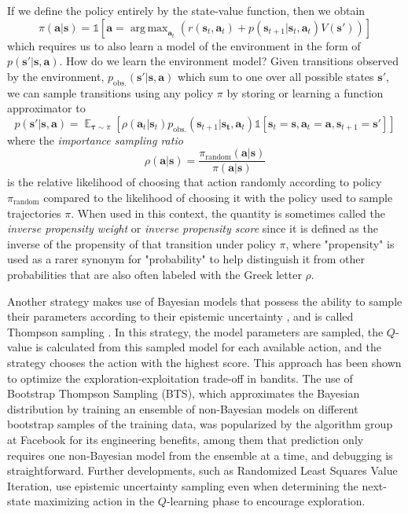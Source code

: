 \documentclass{article}
\DeclareMathOperator*{\argmax}{arg\,max}
\begin{document}
If we define the policy entirely by the state-value function, then we obtain \begin{equation}\pi(\mathbf{a}|\mathbf{s})=\mathbb{1}\left[\mathbf{a}=\argmax_{\mathbf{a}_t}\left(r(\mathbf{s}_t,\mathbf{a}_t)+p(\mathbf{s}_{t+1}|\mathbf{s}_t,\mathbf{a}_t)V(\mathbf{s}')\right)\right]\end{equation}which requires us to also learn a model of the environment in the form of $p(\mathbf{s}'|\mathbf{s},\mathbf{a})$. How do we learn the environment model? Given transitions observed by the environment, $p_\text{obs.}(\mathbf{s}'|\mathbf{s},\mathbf{a})$ which sum to one over all possible states $\mathbf{s}'$, we can sample transitions using any policy $\pi$ by storing or learning a function approximator to \begin{equation}p(\mathbf{s}'|\mathbf{s},\mathbf{a})=\mathop{\mathbb{E}}_{\boldsymbol{\tau}\sim\pi}\left[\rho(\mathbf{a}_t|\mathbf{s}_t)p_\text{obs.}(\mathbf{s}_{t+1}|\mathbf{s_t},\mathbf{a}_t)\mathbb{1}\left[\mathbf{s}_t=\mathbf{s},\mathbf{a}_t=\mathbf{a},\mathbf{s}_{t+1}=\mathbf{s}'\right]\right]\end{equation}where the \textit{importance sampling ratio}
\begin{equation}\rho(\mathbf{a}|\mathbf{s})=\frac{\pi_\text{random}(\mathbf{a}|\mathbf{s})}{\pi(\mathbf{a}|\mathbf{s})}\end{equation}is the relative likelihood of choosing that action randomly according to policy $\pi_\text{random}$ compared to the likelihood of choosing it with the policy used to sample trajectories $\pi$. When used in this context, the quantity is sometimes called the \textit{inverse propensity weight} or \textit{inverse propensity score} since it is defined as the inverse of the propensity of that transition under policy $\pi$, where "propensity" is used as a rarer synonym for "probability" to help distinguish it from other probabilities that are also often labeled with the Greek letter $\rho$.

Another strategy makes use of Bayesian models that possess the ability to sample their parameters according to their epistemic uncertainty \cite{GP_BLR}, and is called Thompson sampling \cite{thompson_sampling}. In this strategy, the model parameters are sampled, the $Q$-value is calculated from this sampled model for each available action, and the strategy chooses the action with the highest score. This approach has been shown to optimize the exploration-exploitation trade-off in bandits\cite{thompson_sampling,bootstrap_DQN}. The use of Bootstrap Thompson Sampling (BTS), which approximates the Bayesian distribution by training an ensemble of non-Bayesian models on different bootstrap samples of the training data, was popularized by the algorithm group at Facebook for its engineering benefits, among them that prediction only requires one non-Bayesian model from the ensemble at a time, and debugging is straightforward\cite{bootstrap_facebook}. Further developments, such as Randomized Least Squares Value Iteration, use epistemic uncertainty sampling even when determining the next-state maximizing action in the $Q$-learning phase\cite{RLSVI} to encourage exploration.
\end{document}
